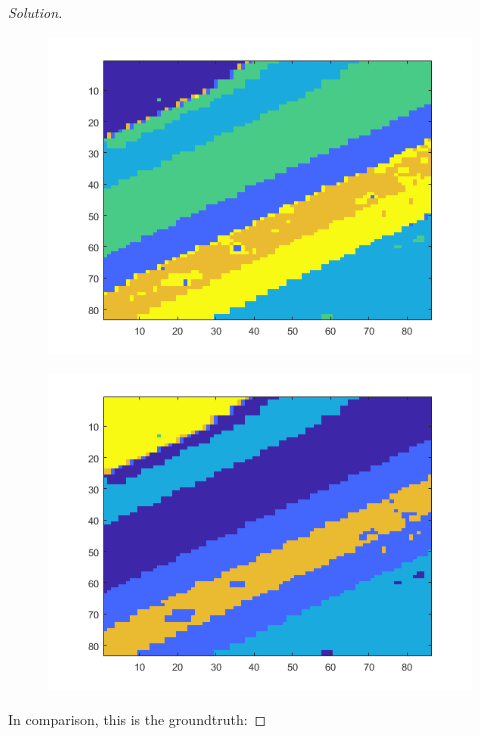 \documentclass[10pt]{article}
\begin{document}
\begin{proof}[Solution]
\begin{figure}[H]
\centering
\begin{minipage}{.5\textwidth}
  \centering
  \includegraphics[width=\linewidth]{50_nn}
  \label{fig:test1}
\end{minipage}%
\begin{minipage}{.5\textwidth}
  \centering
  \includegraphics[width=\linewidth]{100_nn}
  \label{fig:test2}
\end{minipage}
\end{figure}

In comparison, this is the groundtruth:


\end{proof}
\end{document}
